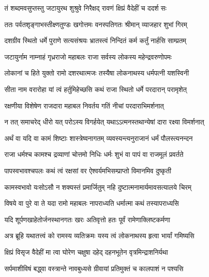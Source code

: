 
\twolineshloka
{तं शब्दमवसुप्तस्तु जटायुरथ शुश्रुवे}
{निरैक्षद् रावणं क्षिप्रं वैदेहीं च ददर्श सः} %

\twolineshloka
{ततः पर्वतशृङ्गाभस्तीक्ष्णतुण्डः खगोत्तमः}
{वनस्पतिगतः श्रीमान् व्याजहार शुभां गिरम्} %

\twolineshloka
{दशग्रीव स्थितो धर्मे पुराणे सत्यसंश्रयः}
{भ्रातस्त्वं निन्दितं कर्म कर्तुं नार्हसि साम्प्रतम्} %

\twolineshloka
{जटायुर्नाम नाम्नाहं गृध्रराजो महाबलः}
{राजा सर्वस्य लोकस्य महेन्द्रवरुणोपमः} %

\twolineshloka
{लोकानां च हिते युक्तो रामो दशरथात्मजः}
{तस्यैषा लोकनाथस्य धर्मपत्नी यशस्विनी} %

\twolineshloka
{सीता नाम वरारोहा यां त्वं हर्तुमिहेच्छसि}
{कथं राजा स्थितो धर्मे परदारान् परामृशेत्} %

\twolineshloka
{रक्षणीया विशेषेण राजदारा महाबल}
{निवर्तय गतिं नीचां परदाराभिमर्शनात्} %

\twolineshloka
{न तत् समाचरेद् धीरो यत् परोऽस्य विगर्हयेत्}
{यथाऽऽत्मनस्तथान्येषां दारा रक्ष्या विमर्शनात्} %

\twolineshloka
{अर्थं वा यदि वा कामं शिष्टाः शास्त्रेष्वनागतम्}
{व्यवस्यन्त्यनुराजानं धर्मं पौलस्त्यनन्दन} %

\twolineshloka
{राजा धर्मश्च कामश्च द्रव्याणां चोत्तमो निधिः}
{धर्मः शुभं वा पापं वा राजमूलं प्रवर्तते} %

\twolineshloka
{पापस्वभावश्चपलः कथं त्वं रक्षसां वर}
{ऐश्वर्यमभिसम्प्राप्तो विमानमिव दुष्कृती} %

\twolineshloka
{कामस्वभावो यःसोऽसौ न शक्यस्तं प्रमार्जितुम्}
{नहि दुष्टात्मनामार्यमावसत्यालये चिरम्} %

\twolineshloka
{विषये वा पुरे वा ते यदा रामो महाबलः}
{नापराध्यति धर्मात्मा कथं तस्यापराध्यसि} %

\twolineshloka
{यदि शूर्पणखाहेतोर्जनस्थानगतः खरः}
{अतिवृत्तो हतः पूर्वं रामेणाक्लिष्टकर्मणा} %

\twolineshloka
{अत्र ब्रूहि यथातत्त्वं को रामस्य व्यतिक्रमः}
{यस्य त्वं लोकनाथस्य हृत्वा भार्यां गमिष्यसि} %

\twolineshloka
{क्षिप्रं विसृज वैदेहीं मा त्वा घोरेण चक्षुषा}
{दहेद् दहनभूतेन वृत्रमिन्द्राशनिर्यथा} %

\twolineshloka
{सर्पमाशीविषं बद्ध्वा वस्त्रान्ते नावबुध्यसे}
{ग्रीवायां प्रतिमुक्तं च कालपाशं न पश्यसि} %

